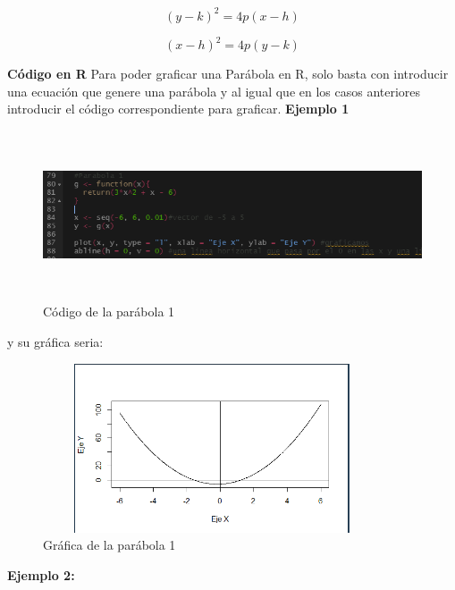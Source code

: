 \documentclass{article}
\begin{document}
\begin{equation}
    (y-k)^2 = 4p(x-h)
\end{equation}

\begin{equation}
    (x-h)^2 = 4p(y-k)
\end{equation}

\textbf{Código en R}
\newline Para poder graficar una Parábola en R, solo basta con introducir una ecuación que genere una parábola y al igual que en los casos anteriores introducir el código correspondiente para graficar.
\newline
\textbf{Ejemplo 1}

\begin{figure}[h]
    \centering
    \includegraphics[width=12cm, height=5cm]{Codigopara1}
    \caption{Código de la parábola 1}
    \label{fig:mesh9}
\end{figure}
y su gráfica seria:
\begin{figure}[h]
    \centering
    \includegraphics[width=10cm, height=5cm]{Grafica5}
    \caption{Gráfica de la parábola 1}
    \label{fig:mesh10}
\end{figure}

\newpage
\textbf{Ejemplo 2:}
\end{document}
